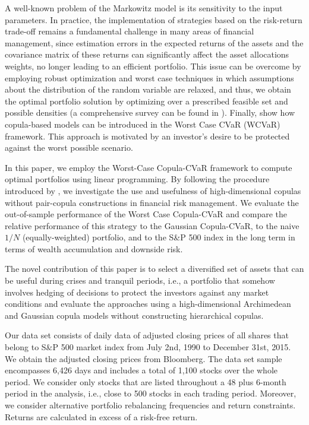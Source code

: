 \documentclass[a4paper,10pt]{article}
\begin{document}
A well-known problem of the Markowitz model is its sensitivity to the input parameters. In practice, the implementation of strategies based on the risk-return trade-off remains a fundamental challenge in many areas of financial management, since estimation errors in the expected returns of the assets and the covariance matrix of these returns can significantly affect the asset allocations weights, no longer leading to an efficient portfolio. This issue can be overcome by employing robust optimization and worst case techniques \citep{benati2003,zhu2009worst,polak2010,fertis2012,kakouris14,polak2017} in which assumptions about the distribution of the random variable are relaxed, and thus, we obtain the optimal portfolio solution by optimizing over a prescribed feasible set and possible densities (a comprehensive survey can be found in \citealp{gabrel2014}). Finally, \citet*{kakouris14} show how copula-based models can be introduced in the Worst Case CVaR (WCVaR) framework. This approach is motivated by an investor's desire to be protected against the worst possible scenario.

In this paper, we employ the Worst-Case Copula-CVaR framework to compute optimal portfolios using linear programming. By following the procedure introduced by \citet*{kakouris14}, we investigate the use and usefulness of high-dimensional copulas without pair-copula constructions in financial risk management. We evaluate the out-of-sample performance of the Worst Case Copula-CVaR and compare the relative performance of this strategy to the Gaussian Copula-CVaR, to the naive $1/N$ (equally-weighted) portfolio, and to the S\&P 500 index in the long term in terms of wealth accumulation and downside risk.

The novel contribution of this paper is to select a diversified set of assets that can be useful during crises and tranquil periods, i.e., a portfolio that somehow involves hedging of decisions to protect the investors against any market conditions and evaluate the approaches using a high-dimensional Archimedean and Gaussian copula models without constructing hierarchical copulas. 

Our data set consists of daily data of adjusted closing prices of all shares that belong to S\&P 500 market index from July 2nd, 1990 to December 31st, 2015. We obtain the adjusted closing prices from Bloomberg. The data set sample encompasses 6,426 days and includes a total of 1,100 stocks over the whole period. We consider only stocks that are listed throughout a 48 plus 6-month period in the analysis, i.e., close to 500 stocks in each trading period. Moreover, we consider alternative portfolio rebalancing frequencies and return constraints. Returns are calculated in excess of a risk-free return.
\end{document}
